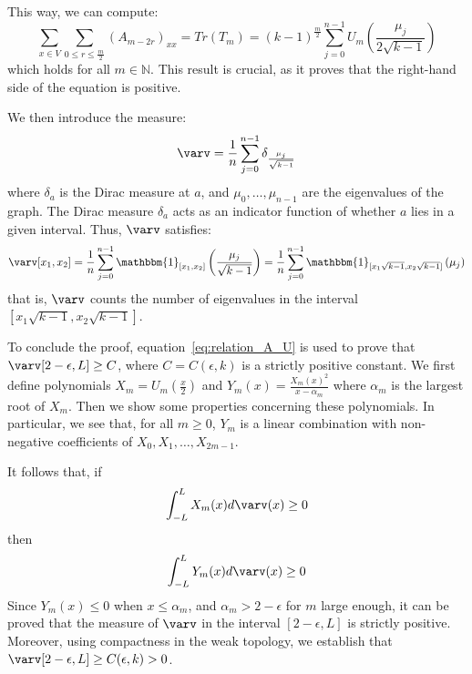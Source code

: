 \documentclass[11pt]{article}
\theoremstyle{definition}
\begin{document}
    This way, we can compute:
    \begin{equation}
        \label{eq:relation_A_U}
        \sum_{x \in V} \sum_{0\leq r \leq\frac{m}{2}} \left(A_{m-2r}\right)_{xx} =
            Tr(T_m) =
            (k-1)^{\frac{m}{2}} \sum_{j=0}^{n-1} U_m\left(\frac{\mu_j}{2\sqrt{k-1}}\right)
    \end{equation}
    which holds for all $m \in \mathbb{N}$.
    This result is crucial, as it proves that the right-hand side of the equation is positive.
    \newline

    We then introduce the measure:
    $$\varv = \frac{1}{n} \sum^{n-1}_{j=0} \delta_{\frac{\mu_j}{\sqrt{k-1}}}$$
    where $\delta_a$ is the Dirac measure at $a$, and $\mu_0, \dots, \mu_{n-1}$ are the eigenvalues of the graph.
    The Dirac measure $\delta_a$ acts as an indicator function of whether $a$ lies in a given interval.
    Thus, $\varv$ satisfies:
    \begin{equation}
        \label{eq:v_counts_eigenvalues}
    \varv[x_1, x_2] = \frac{1}{n} \sum_{j=0}^{n-1} \mathbbm{1}_{[x_1, x_2]}\left(\frac{\mu_j}{\sqrt{k-1}}\right)
        = \frac{1}{n} \sum_{j=0}^{n-1} \mathbbm{1}_{[x_1 \sqrt{k-1}, x_2 \sqrt{k-1}]}\left(\mu_j\right)
    \end{equation}
    that is, $\varv$ counts the number of eigenvalues in the interval $[x_1 \sqrt{k-1}, x_2 \sqrt{k-1}]$.
    \newline

    To conclude the proof, equation~\eqref{eq:relation_A_U} is used to prove that $\varv[2-\epsilon, L] \geq C$, where
    $C = C(\epsilon, k)$ is a strictly positive constant.
    We first define polynomials $X_m = U_m(\frac{x}{2})$ and $Y_m(x) = \frac{X_m(x)^2}{x - \alpha_m}$ where
    $\alpha_m$ is the largest root of $X_m$.
    Then we show some properties concerning these polynomials.
    In particular, we see that, for all $m \geq 0$, $Y_m$ is a linear combination with non-negative coefficients
    of $X_0, X_1, \dots, X_{2m-1}$.
    \newline

    It follows that, if
    $$\int_{-L}^{L} X_m(x) d \varv(x) \geq 0$$
    then
    $$\int_{-L}^{L} Y_m(x) d \varv(x) \geq 0$$
    Since $Y_m(x) \leq 0$ when $x \leq \alpha_m$, and $\alpha_m > 2 - \epsilon$ for $m$ large enough,
    it can be proved that the measure of $\varv$ in the interval $[2-\epsilon, L]$ is strictly positive.
    Moreover, using compactness in the weak topology, we establish that $\varv[2 - \epsilon, L] \geq C(\epsilon, k) > 0$.
    \newline
\end{document}

